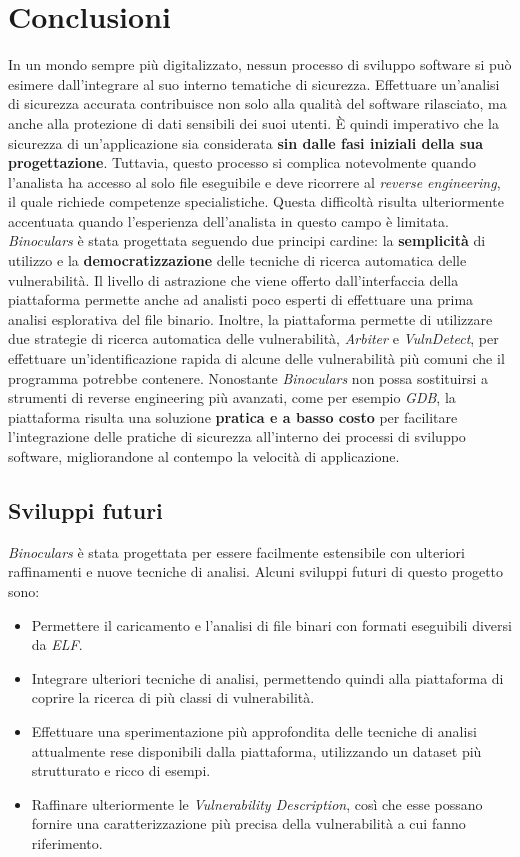 \documentclass[../main.tex]{subfiles}
\begin{document}
\chapter{Conclusioni}
In un mondo sempre più digitalizzato, nessun processo di sviluppo software si può esimere dall'integrare al suo interno tematiche di sicurezza.
Effettuare un'analisi di sicurezza accurata contribuisce non solo alla qualità del software rilasciato, ma anche alla protezione di
dati sensibili dei suoi utenti. È quindi imperativo che la sicurezza di un'applicazione sia considerata \textbf{sin dalle fasi iniziali della sua progettazione}.
Tuttavia, questo processo si complica notevolmente quando l'analista ha accesso al solo file eseguibile e deve ricorrere al \textit{reverse engineering}, il quale richiede
competenze specialistiche. Questa difficoltà risulta ulteriormente accentuata quando l'esperienza dell'analista in questo campo è limitata.
\textit{Binoculars} è stata progettata seguendo due principi cardine: la \textbf{semplicità} di utilizzo e la \textbf{democratizzazione} delle tecniche di ricerca automatica delle vulnerabilità. 
Il livello di astrazione che viene offerto dall'interfaccia della piattaforma permette anche ad analisti poco esperti di effettuare una prima analisi esplorativa del file binario.
Inoltre, la piattaforma permette di utilizzare due strategie di ricerca automatica delle vulnerabilità, \textit{Arbiter} e \textit{VulnDetect}, per effettuare un'identificazione
rapida di alcune delle vulnerabilità più comuni che il programma potrebbe contenere. Nonostante \textit{Binoculars} non possa sostituirsi a strumenti di reverse engineering più avanzati, come per esempio
\textit{GDB}, la piattaforma risulta una soluzione \textbf{pratica e a basso costo} per facilitare l'integrazione delle pratiche di sicurezza all'interno dei processi di sviluppo software, migliorandone al contempo
la velocità di applicazione.
\section{Sviluppi futuri}
\textit{Binoculars} è stata progettata per essere facilmente estensibile con ulteriori raffinamenti e nuove tecniche di analisi. Alcuni sviluppi futuri di questo progetto sono:
\begin{itemize}
    \item Permettere il caricamento e l'analisi di file binari con formati eseguibili diversi da \textit{ELF}.
    \item Integrare ulteriori tecniche di analisi, permettendo quindi alla piattaforma di coprire la ricerca di più classi di vulnerabilità.
    \item Effettuare una sperimentazione più approfondita delle tecniche di analisi attualmente rese disponibili dalla piattaforma, utilizzando un dataset più strutturato e ricco di esempi.
    \item Raffinare ulteriormente le \textit{Vulnerability Description}, così che esse possano fornire una caratterizzazione più precisa della vulnerabilità a cui fanno riferimento.
\end{itemize}
\end{document}
